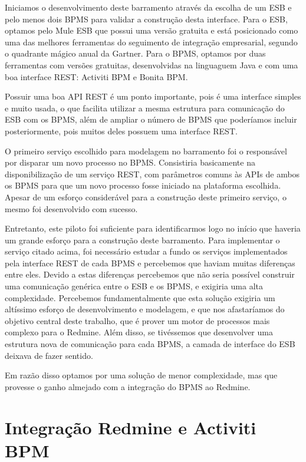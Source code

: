 Iniciamos o desenvolvimento deste barramento através da escolha de um ESB e pelo menos dois BPMS para validar a construção desta interface. Para o ESB, optamos pelo Mule ESB\cite{mule} que possui uma versão gratuita e está posicionado como uma das melhores ferramentas do seguimento de integração empresarial, segundo o quadrante mágico anual da Gartner\cite{mule_gartner}. Para o BPMS, optamos por duas ferramentas com versões gratuitas, desenvolvidas na linguaguem Java e com uma boa interface REST\cite{rest}: Activiti BPM\cite{bpm_activiti} e Bonita BPM\cite{bpm_bonita}.

Possuir uma boa API REST\cite{rest} é um ponto importante, pois é uma interface simples e muito usada, o que facilita utilizar a mesma estrutura para comunicação do ESB com os BPMS, além de ampliar o número de BPMS que poderíamos incluir posteriormente, pois muitos deles possuem uma interface REST.

O primeiro serviço escolhido para modelagem no barramento foi o responsável por disparar um novo processo no BPMS. Consistiria basicamente na disponibilização de um serviço REST, com parâmetros comuns às APIs de ambos os BPMS para que um novo processo fosse iniciado na plataforma escolhida. Apesar de um esforço considerável para a construção deste primeiro serviço, o mesmo foi desenvolvido com sucesso.  

Entretanto, este piloto foi suficiente para identificarmos logo no início que haveria um grande esforço para a construção deste barramento. Para implementar o serviço citado acima, foi necessário estudar a fundo os serviços implementados pela interface REST de cada BPMS e percebemos que haviam muitas diferenças entre eles. Devido a estas diferenças percebemos que não seria possível construir uma comunicação genérica entre o ESB e os BPMS, e exigiria uma alta complexidade. Percebemos fundamentalmente que esta solução exigiria um altíssimo esforço de desenvolvimento e modelagem, e que nos afastaríamos do objetivo central deste trabalho, que é prover um motor de processos mais complexo para o Redmine. Além disso, se tivéssemos que desenvolver uma estrutura nova de comunicação para cada BPMS, a camada de interface do ESB deixava de fazer sentido.

Em razão disso optamos por uma solução de menor complexidade, mas que provesse o ganho almejado com a integração do BPMS ao Redmine.

\section{Integração Redmine e Activiti BPM}\label{sec:activiti-bpm}


